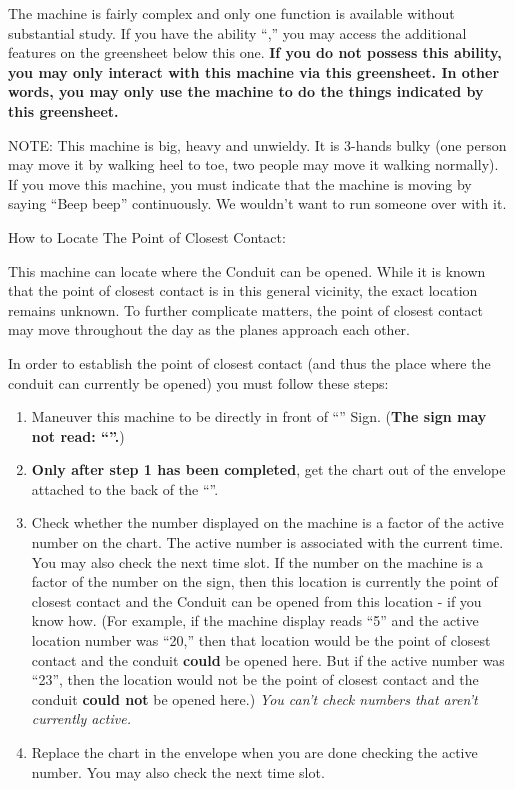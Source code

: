 \documentclass[green]{elementals}
\begin{document}
\name{\gConduitCover{}}


The machine is fairly complex and only one function is available without substantial study. If you have the ability ``\aWorkConduit{},'' you may access the additional features on the greensheet below this one. {\bf If you do not possess this ability, you may only interact with this machine via this greensheet. In other words, you may only use the machine to do the things indicated by this greensheet.}

NOTE: This machine is big, heavy and unwieldy. It is 3-hands bulky (one person may move it by walking heel to toe, two people may move it walking normally). If you move this machine, you must indicate that the machine is moving by saying ``Beep beep'' continuously. We wouldn't want to run someone over with it.



{\large How to Locate The Point of Closest Contact:}


This machine can locate where the Conduit can be opened. While it is known that the point of closest contact is in this general vicinity, the exact location remains unknown. To further complicate matters, the point of closest contact may move throughout the day as the planes approach each other.

In order to establish the point of closest contact (and thus the place where the conduit can currently be opened) you must follow these steps:
\begin{enumerate}
  \item Maneuver this machine to be directly in front of ``\sLocationCoverSheet{}'' Sign. ({\bf The sign may not read: ``\sSealedLocationSheet{}''.})
  \item {\bf Only after step 1 has been completed}, get the chart out of the envelope attached to the back of the ``\sLocationCoverSheet{}''.
  \item Check whether the number displayed on the machine is a factor of the active number on the chart. The active number is associated with the current time. You may also check the next time slot. If the number on the machine is a factor of the number on the sign, then this location is currently the point of closest contact and the Conduit can be opened from this location - if you know how. (For example, if the machine display reads ``5'' and the active location number was ``20,'' then that location would be the point of closest contact and the conduit {\bf could} be opened here. But if the active number was ``23'', then the location would not be the point of closest contact and the conduit {\bf could not} be opened here.) \emph{You can't check numbers that aren't currently active.} 
  \item Replace the chart in the envelope when you are done checking the active number. You may also check the next time slot.
\end{enumerate}
\end{document}
